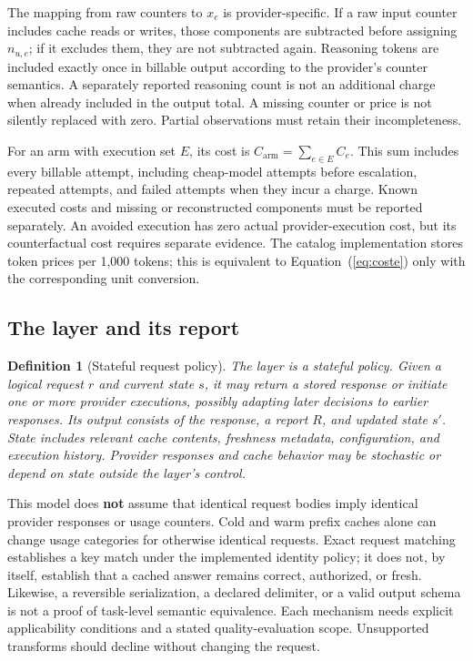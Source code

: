 \documentclass[11pt,a4paper]{article}
\newtheorem{definition}{Definition}
\begin{document}
The mapping from raw counters to $x_e$ is provider-specific. If a raw input counter includes
cache reads or writes, those components are subtracted before assigning $n_{u,e}$; if it
excludes them, they are not subtracted again. Reasoning tokens are included exactly once in
billable output according to the provider's counter semantics. A separately reported reasoning
count is not an additional charge when already included in the output total. A missing counter
or price is not silently replaced with zero. Partial observations must retain their
incompleteness.

For an arm with execution set $E$, its cost is $C_{\mathrm{arm}}=\sum_{e\in E} C_e$. This sum
includes every billable attempt, including cheap-model attempts before escalation, repeated
attempts, and failed attempts when they incur a charge. Known executed costs and missing or
reconstructed components must be reported separately. An avoided execution has zero actual
provider-execution cost, but its counterfactual cost requires separate evidence. The catalog
implementation stores token prices per 1{,}000 tokens; this is equivalent to
Equation~(\ref{eq:coste}) only with the corresponding unit conversion.

\subsection{The layer and its report}

\begin{definition}[Stateful request policy]
The layer is a stateful policy. Given a logical request $r$ and current state $s$, it may return
a stored response or initiate one or more provider executions, possibly adapting later decisions
to earlier responses. Its output consists of the response, a report $R$, and updated state
$s'$. State includes relevant cache contents, freshness metadata, configuration, and execution
history. Provider responses and cache behavior may be stochastic or depend on state outside the
layer's control.
\end{definition}

This model does \textbf{not} assume that identical request bodies imply identical provider
responses or usage counters. Cold and warm prefix caches alone can change usage categories for
otherwise identical requests. Exact request matching establishes a key match under the
implemented identity policy; it does not, by itself, establish that a cached answer remains
correct, authorized, or fresh. Likewise, a reversible serialization, a declared delimiter, or a
valid output schema is not a proof of task-level semantic equivalence. Each mechanism needs
explicit applicability conditions and a stated quality-evaluation scope. Unsupported transforms
should decline without changing the request.
\end{document}
